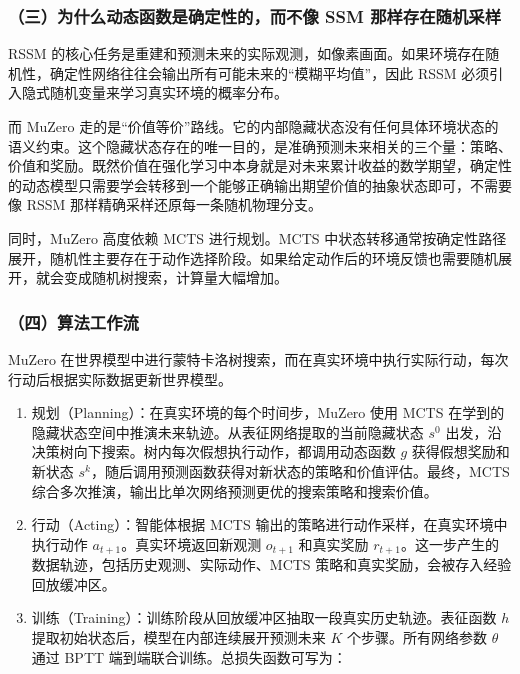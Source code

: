 \hypertarget{ux4e09ux4e3aux4ec0ux4e48ux52a8ux6001ux51fdux6570ux662fux786eux5b9aux6027ux7684ux800cux4e0dux50cf-ssm-ux90a3ux6837ux5b58ux5728ux968fux673aux91c7ux6837}{%
\subsubsection{（三）为什么动态函数是确定性的，而不像 SSM 那样存在随机采样}\label{ux4e09ux4e3aux4ec0ux4e48ux52a8ux6001ux51fdux6570ux662fux786eux5b9aux6027ux7684ux800cux4e0dux50cf-ssm-ux90a3ux6837ux5b58ux5728ux968fux673aux91c7ux6837}}

RSSM 的核心任务是重建和预测未来的实际观测，如像素画面。如果环境存在随机性，确定性网络往往会输出所有可能未来的``模糊平均值''，因此 RSSM 必须引入隐式随机变量来学习真实环境的概率分布。

而 MuZero 走的是``价值等价''路线。它的内部隐藏状态没有任何具体环境状态的语义约束。这个隐藏状态存在的唯一目的，是准确预测未来相关的三个量：策略、价值和奖励。既然价值在强化学习中本身就是对未来累计收益的数学期望，确定性的动态模型只需要学会转移到一个能够正确输出期望价值的抽象状态即可，不需要像 RSSM 那样精确采样还原每一条随机物理分支。

同时，MuZero 高度依赖 MCTS 进行规划。MCTS 中状态转移通常按确定性路径展开，随机性主要存在于动作选择阶段。如果给定动作后的环境反馈也需要随机展开，就会变成随机树搜索，计算量大幅增加。

\hypertarget{ux56dbux7b97ux6cd5ux5de5ux4f5cux6d41}{%
\subsubsection{（四）算法工作流}\label{ux56dbux7b97ux6cd5ux5de5ux4f5cux6d41}}

MuZero 在世界模型中进行蒙特卡洛树搜索，而在真实环境中执行实际行动，每次行动后根据实际数据更新世界模型。

\begin{enumerate}
\def\labelenumi{\arabic{enumi}.}
\tightlist
\item
  规划（Planning）：在真实环境的每个时间步，MuZero 使用 MCTS 在学到的隐藏状态空间中推演未来轨迹。从表征网络提取的当前隐藏状态 \(s^0\) 出发，沿决策树向下搜索。树内每次假想执行动作，都调用动态函数 \(g\) 获得假想奖励和新状态 \(s^k\)，随后调用预测函数获得对新状态的策略和价值评估。最终，MCTS 综合多次推演，输出比单次网络预测更优的搜索策略和搜索价值。
\item
  行动（Acting）：智能体根据 MCTS 输出的策略进行动作采样，在真实环境中执行动作 \(a_{t+1}\)。真实环境返回新观测 \(o_{t+1}\) 和真实奖励 \(r_{t+1}\)。这一步产生的数据轨迹，包括历史观测、实际动作、MCTS 策略和真实奖励，会被存入经验回放缓冲区。
\item
  训练（Training）：训练阶段从回放缓冲区抽取一段真实历史轨迹。表征函数 \(h\) 提取初始状态后，模型在内部连续展开预测未来 \(K\) 个步骤。所有网络参数 \(\theta\) 通过 BPTT 端到端联合训练。总损失函数可写为：
\end{enumerate}

